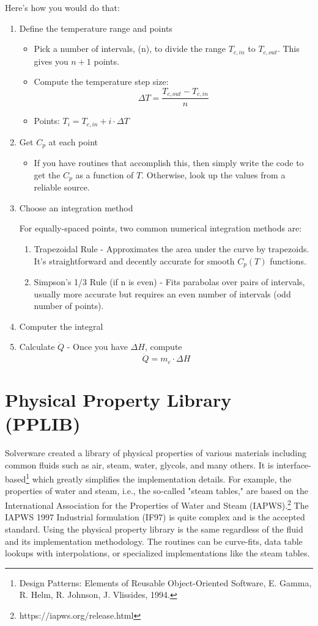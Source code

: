\documentclass[letterpaper,twocolumn]{article}  %
\begin{document}
	Here's how you would do that:
	
	\begin{enumerate}
		\item Define the temperature range and points
			\begin{itemize}
				\item Pick a number of intervals, (n), to divide the range $T_{c,in}$ to $T_{c,out}$. This gives you $n+1$ points.
				\item Compute the temperature step size: 
				$$\Delta T = \frac{T_{c,out} - T_{c,in}}{n}$$
				\item Points: $T_i= T_{c,in} + i\cdot\Delta T$
			\end{itemize}
		\item Get $C_p$ at each point
			\begin{itemize}
				\item If you have routines that accomplish this, then simply write the code to get the $C_p$ as a function of $T$. Otherwise, look up the values from a reliable source.
			\end{itemize}	
		\item Choose an integration method
		
		For equally-spaced points, two common numerical integration methods are:
			\begin{enumerate}
				\item Trapezoidal Rule - Approximates the area under the curve by trapezoids. It’s straightforward and decently accurate for smooth $C_p(T)$ functions.
				\item Simpson's 1/3 Rule (if n is even) - Fits parabolas over pairs of intervals, usually more accurate but requires an even number of intervals (odd number of points).
			\end{enumerate}
		\item Computer the integral
		\item Calculate $\dot Q$ - 
		Once you have $\Delta H$, 
		compute $$\dot Q = m_c\cdot\Delta H $$
		
	\end{enumerate}
	
	
	\section{Physical Property Library (PPLIB)}
	Solverware created a library of physical properties of various materials including common fluids such as air, steam, water, glycols, and many others. It is interface-based\footnote{Design Patterns: Elements of Reusable Object-Oriented Software, E. Gamma, R. Helm, R. Johnson, J. Vlissides, 1994.} which greatly simplifies the implementation details. For example, the properties of water and steam, i.e., the so-called "steam tables," are based on the International Association for the Properties of Water and Steam (IAPWS).\footnote{https://iapws.org/release.html} The IAPWS 1997 Industrial formulation (IF97) is quite complex and is the accepted standard. Using the physical property library is the same regardless of the fluid and its implementation methodology. The routines can be curve-fits, data table lookups with interpolations, or specialized implementations like the steam tables.
	
\end{document}

